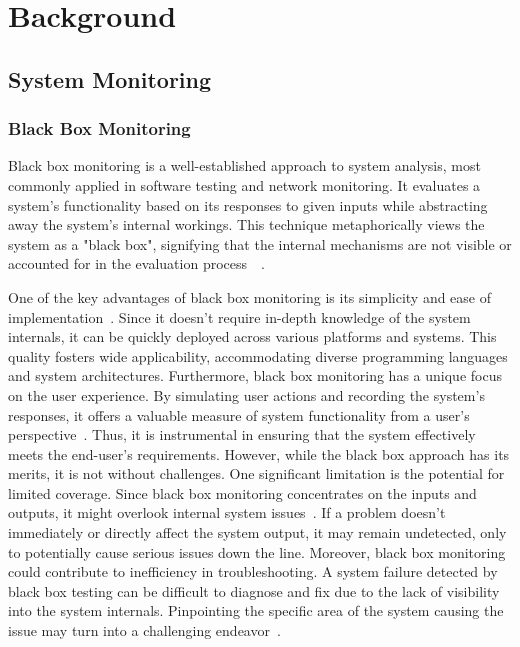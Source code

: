 
\chapter{Background}\label{chapter:background}

\section{System Monitoring}

\subsection{Black Box Monitoring}

Black box monitoring is a well-established approach to system analysis, most commonly applied in software testing and network monitoring. It evaluates a system's functionality based on its responses to given inputs while abstracting away the system's internal workings. This technique metaphorically views the system as a "black box", signifying that the internal mechanisms are not visible or accounted for in the evaluation process~\parencite{beizer_black_1996}~\parencite{hierons_software_2006}.

One of the key advantages of black box monitoring is its simplicity and ease of implementation~\parencite{jain_art_1991}. Since it doesn't require in-depth knowledge of the system internals, it can be quickly deployed across various platforms and systems. This quality fosters wide applicability, accommodating diverse programming languages and system architectures. Furthermore, black box monitoring has a unique focus on the user experience. By simulating user actions and recording the system's responses, it offers a valuable measure of system functionality from a user's perspective~\parencite{jorgensen_software_2021}. Thus, it is instrumental in ensuring that the system effectively meets the end-user's requirements. However, while the black box approach has its merits, it is not without challenges. One significant limitation is the potential for limited coverage. Since black box monitoring concentrates on the inputs and outputs, it might overlook internal system issues~\parencite{kaner_testing_1999}. If a problem doesn't immediately or directly affect the system output, it may remain undetected, only to potentially cause serious issues down the line. Moreover, black box monitoring could contribute to inefficiency in troubleshooting. A system failure detected by black box testing can be difficult to diagnose and fix due to the lack of visibility into the system internals. Pinpointing the specific area of the system causing the issue may turn into a challenging endeavor~\parencite{kaner_testing_1999}.

